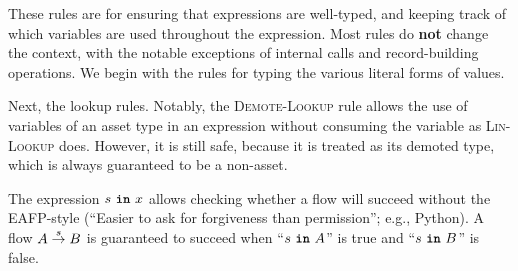 \documentclass[dvipsnames, usenames, sigconf]{acmart}
\begin{document}
These rules are for ensuring that expressions are well-typed, and keeping track of which variables are used throughout the expression.
Most rules do \textbf{not} change the context, with the notable exceptions of internal calls and record-building operations.
We begin with the rules for typing the various literal forms of values.
\begin{mathpar}



\end{mathpar}

Next, the lookup rules.
Notably, the \textsc{Demote-Lookup} rule allows the use of variables of an asset type in an expression without consuming the variable as \textsc{Lin-Lookup} does.
However, it is still safe, because it is treated as its demoted type, which is always guaranteed to be a non-asset.

\begin{mathpar}


\end{mathpar}

The expression $s~\varin~x$ allows checking whether a flow will succeed without the EAFP-style (``Easier to ask for forgiveness than permission''; e.g., Python).
A flow $A \sends{s} B$ is guaranteed to succeed when ``$s~\varin~A$'' is true and ``$s~\varin~B$'' is false.
\begin{mathpar}
\end{mathpar}
\end{document}
